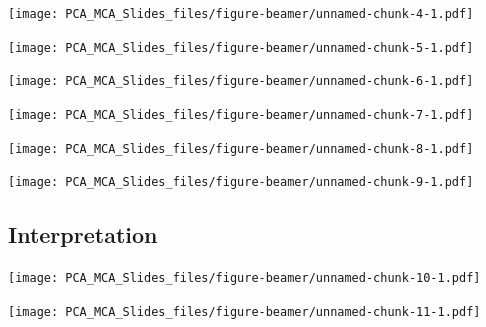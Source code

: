 \documentclass[
  ignorenonframetext,
]{beamer}
\begin{document}
\begin{frame}

\texttt{[image: PCA\_MCA\_Slides\_files/figure-beamer/unnamed-chunk-4-1.pdf]}

\end{frame}

\begin{frame}

\texttt{[image: PCA\_MCA\_Slides\_files/figure-beamer/unnamed-chunk-5-1.pdf]}

\end{frame}

\begin{frame}

\texttt{[image: PCA\_MCA\_Slides\_files/figure-beamer/unnamed-chunk-6-1.pdf]}

\end{frame}

\begin{frame}

\texttt{[image: PCA\_MCA\_Slides\_files/figure-beamer/unnamed-chunk-7-1.pdf]}

\end{frame}

\begin{frame}

\texttt{[image: PCA\_MCA\_Slides\_files/figure-beamer/unnamed-chunk-8-1.pdf]}

\end{frame}

\begin{frame}

\texttt{[image: PCA\_MCA\_Slides\_files/figure-beamer/unnamed-chunk-9-1.pdf]}

\end{frame}

\hypertarget{interpretation}{%
\subsection{Interpretation}\label{interpretation}}

\begin{frame}

\texttt{[image: PCA\_MCA\_Slides\_files/figure-beamer/unnamed-chunk-10-1.pdf]}

\end{frame}

\begin{frame}

\texttt{[image: PCA\_MCA\_Slides\_files/figure-beamer/unnamed-chunk-11-1.pdf]}

\end{frame}
\end{document}
